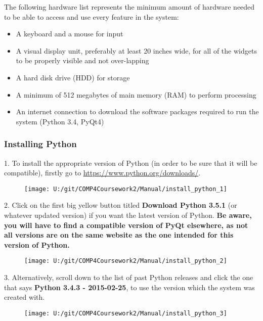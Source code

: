 The following hardware list represents the minimum amount of hardware needed to be able to access and use every feature in the system:

\begin{itemize}
	\item A keyboard and a mouse for input 
	\item A visual display unit, preferably at least 20 inches wide, for all of the widgets to be properly visible and not over-lapping
	\item A hard disk drive (HDD) for storage
	\item A minimum of 512 megabytes of main memory (RAM) to perform processing
	\item An internet connection to download the software packages required to run the system (Python 3.4, PyQt4)
\end{itemize}

\subsubsection{Installing Python}

1. To install the appropriate version of Python (in order to be sure that it will be compatible), firstly go to \url{https://www.python.org/downloads/}.

\begin{figure}[H]
    \texttt{[image: U:/git/COMP4Coursework2/Manual/install\_python\_1]}
\end{figure}

2. Click on the first big yellow button titled \textbf{Download Python 3.5.1} (or whatever updated version) if you want the latest version of Python. \textbf{Be aware, you will have to find a compatible version of PyQt elsewhere, as not all versions are on the same website as the one intended for this version of Python.}

\begin{figure}[H]
    \texttt{[image: U:/git/COMP4Coursework2/Manual/install\_python\_2]}
\end{figure}

3. Alternatively, scroll down to the list of past Python releases and click the one that says \textbf{Python 3.4.3 - 2015-02-25}, to use the version which the system was created with. 

\begin{figure}[H]
    \texttt{[image: U:/git/COMP4Coursework2/Manual/install\_python\_3]}
\end{figure}

